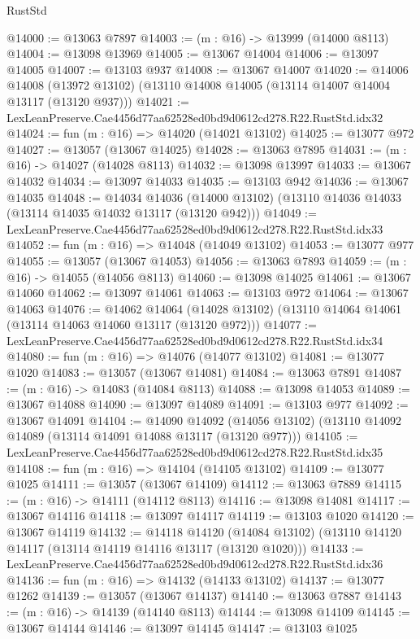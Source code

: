 \begin{lexlean}{RustStd}
\begin{coremodule}
@14000 := @13063 @7897
@14003 := (m : @16) -> @13999 (@14000 @8113)
@14004 := @13098 @13969
@14005 := @13067 @14004
@14006 := @13097 @14005
@14007 := @13103 @937
@14008 := @13067 @14007
@14020 := @14006
    @14008
    (@13972 @13102)
    (@13110 @14008 @14005 (@13114 @14007 @14004 @13117 (@13120 @937)))
@14021 := LexLeanPreserve.Cae4456d77aa62528ed0bd9d0612cd278.R22.RustStd.idx32
@14024 := fun (m : @16) => @14020 (@14021 @13102)
@14025 := @13077 @972
@14027 := @13057 (@13067 @14025)
@14028 := @13063 @7895
@14031 := (m : @16) -> @14027 (@14028 @8113)
@14032 := @13098 @13997
@14033 := @13067 @14032
@14034 := @13097 @14033
@14035 := @13103 @942
@14036 := @13067 @14035
@14048 := @14034
    @14036
    (@14000 @13102)
    (@13110 @14036 @14033 (@13114 @14035 @14032 @13117 (@13120 @942)))
@14049 := LexLeanPreserve.Cae4456d77aa62528ed0bd9d0612cd278.R22.RustStd.idx33
@14052 := fun (m : @16) => @14048 (@14049 @13102)
@14053 := @13077 @977
@14055 := @13057 (@13067 @14053)
@14056 := @13063 @7893
@14059 := (m : @16) -> @14055 (@14056 @8113)
@14060 := @13098 @14025
@14061 := @13067 @14060
@14062 := @13097 @14061
@14063 := @13103 @972
@14064 := @13067 @14063
@14076 := @14062
    @14064
    (@14028 @13102)
    (@13110 @14064 @14061 (@13114 @14063 @14060 @13117 (@13120 @972)))
@14077 := LexLeanPreserve.Cae4456d77aa62528ed0bd9d0612cd278.R22.RustStd.idx34
@14080 := fun (m : @16) => @14076 (@14077 @13102)
@14081 := @13077 @1020
@14083 := @13057 (@13067 @14081)
@14084 := @13063 @7891
@14087 := (m : @16) -> @14083 (@14084 @8113)
@14088 := @13098 @14053
@14089 := @13067 @14088
@14090 := @13097 @14089
@14091 := @13103 @977
@14092 := @13067 @14091
@14104 := @14090
    @14092
    (@14056 @13102)
    (@13110 @14092 @14089 (@13114 @14091 @14088 @13117 (@13120 @977)))
@14105 := LexLeanPreserve.Cae4456d77aa62528ed0bd9d0612cd278.R22.RustStd.idx35
@14108 := fun (m : @16) => @14104 (@14105 @13102)
@14109 := @13077 @1025
@14111 := @13057 (@13067 @14109)
@14112 := @13063 @7889
@14115 := (m : @16) -> @14111 (@14112 @8113)
@14116 := @13098 @14081
@14117 := @13067 @14116
@14118 := @13097 @14117
@14119 := @13103 @1020
@14120 := @13067 @14119
@14132 := @14118
    @14120
    (@14084 @13102)
    (@13110 @14120 @14117 (@13114 @14119 @14116 @13117 (@13120 @1020)))
@14133 := LexLeanPreserve.Cae4456d77aa62528ed0bd9d0612cd278.R22.RustStd.idx36
@14136 := fun (m : @16) => @14132 (@14133 @13102)
@14137 := @13077 @1262
@14139 := @13057 (@13067 @14137)
@14140 := @13063 @7887
@14143 := (m : @16) -> @14139 (@14140 @8113)
@14144 := @13098 @14109
@14145 := @13067 @14144
@14146 := @13097 @14145
@14147 := @13103 @1025

\end{coremodule}
\end{lexlean}
